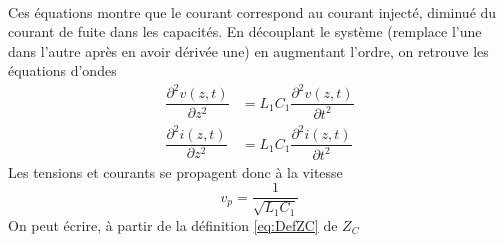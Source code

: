 \ 

Ces équations montre que le courant correspond au courant injecté, diminué du courant de 
fuite dans les capacités. En découplant le système (remplace l'une dans l'autre après 
en avoir dérivée une) en augmentant l'ordre, on retrouve les équations d'ondes
\begin{equation}
\begin{array}{ll}
\dfrac{\partial^2 v(z,t)}{\partial z^2} &= L_1C_1\dfrac{\partial^2 v(z,t)}{\partial t^2}\\
\dfrac{\partial^2 i(z,t)}{\partial z^2} &= L_1C_1\dfrac{\partial^2 i(z,t)}{\partial t^2}
\end{array}
\end{equation}
Les tensions et courants se propagent donc à la vitesse 
\begin{equation}
v_p = \dfrac{1}{\sqrt{L_1C_1}}
\end{equation}
On peut écrire, à partir de la définition \autoref{eq:DefZC} de $Z_C$\\
\ \\

